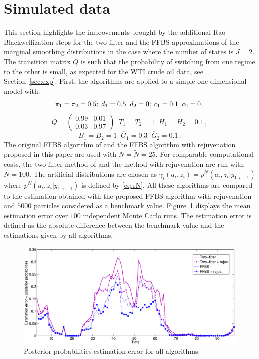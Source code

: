 \documentclass[nolayout]{article}
\theoremstyle{plain}
\theoremstyle{definition}
\newcommand{\1}{\mathbbm{1}}
\def\barG{\overline{G}}
\def\barH{\overline{H}}
\def\eqsp{\,}
\begin{document}
\section{Simulated data}
\label{sec:numerical:experiments}
This section highlights the improvements brought by  the additional Rao-Blackwellization steps for the two-filter and the FFBS approximations of the marginal smoothing distributions in the case where the number of states is $J=2$. The transition matrix $Q$ is such that the probability of switching from one regime to the other is small, as expected for the WTI crude oil data, see Section~\ref{sec:exp}. First, the algorithms are applied to a simple one-dimensional model with:
\[
\pi_1=\pi_2 = 0.5\\;\;d_1 = 0.5\;\; d_2 = 0;\;c_1= 0.1\;\; c_2 = 0 \eqsp,
\]
\[
Q = \begin{pmatrix}0.99 & 0.01\\ 0.03 & 0.97\end{pmatrix}\;\;T_1 = T_2 = 1\;\;\barH_1 = \barH_2= 0.1\eqsp,
\]
\[
B_1 = B_2 =1\;\;\barG_1 = 0.3\;\;\barG_2 = 0.1\eqsp.
\]
The original FFBS algorithm of \cite{lindsten:bunch:sarkka:schon:godsill:2015} and the FFBS algorithm with rejuvenation proposed in this paper are used with $N = \tilde{N} = 25$. For comparable computational costs, the two-filter method of \cite{briers:doucet:maskell:2010} and the method with rejuvenation are run with $N=100$.  The artificial distributions are chosen as $\gamma^{}_i (a_i, z_i) = p^N(a_{i},z_{i}|y_{1:i-1})$ where $p^N(a_{i},z_{i}|y_{1:i-1})$ is defined by \eqref{eq:rN}. All these algorithms are compared to the estimation obtained with the proposed FFBS algorithm with rejuvenation and $5000$ particles considered as a benchmark value. Figure~\ref{fig:ffbs:err} displays the mean estimation error over $100$ independent Monte Carlo runs. The estimation error is defined as the absolute difference between the benchmark value and the estimations given by all algorithms.
\begin{figure}
\centering
\includegraphics[scale=.3]{err_est}
\caption{Posterior probabilities estimation error for all algorithms.}
\label{fig:ffbs:err}
\end{figure}
\end{document}

